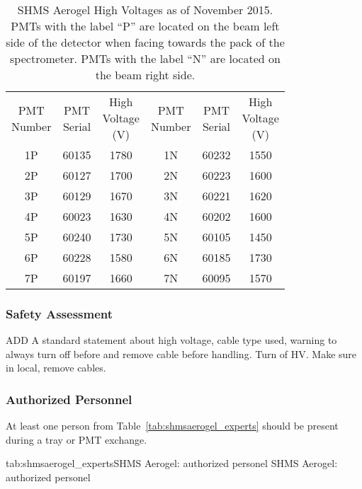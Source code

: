 {\begin{table}
\caption{SHMS Aerogel High Voltages as of November 2015.  PMTs with
  the label ``P'' are located on the beam left side of the detector
  when facing towards the pack of the spectrometer.  PMTs with the
  label ``N'' are located on the beam right side.
\label{tab:shms_aerogelhv}}
\begin{center}
\begin{tabular}{cccccc}
\specialcell{PMT\\Number}&\specialcell{PMT\\Serial}
&\specialcell{High\\Voltage\\(V)}&\specialcell{PMT\\Number}
&\specialcell{PMT\\Serial}&\specialcell{High\\Voltage\\(V)}\\
1P & 60135 & 1780 & 1N & 60232 & 1550\\
2P & 60127 & 1700 & 2N & 60223 & 1600\\
3P & 60129 & 1670 & 3N & 60221 & 1620\\
4P & 60023 & 1630 & 4N & 60202 & 1600\\
5P & 60240 & 1730 & 5N & 60105 & 1450\\
6P & 60228 & 1580 & 6N & 60185 & 1730\\
7P & 60197 & 1660 & 7N & 60095 & 1570\\
\end{tabular}
\end{center}
\end{table}


\begin{safetyen}{0}{0}

\subsubsection{Safety Assessment}

ADD A standard statement about high voltage, cable type used, warning
to always turn off before and remove cable before handling.
Turn of HV.  Make sure in local, remove cables.


\subsubsection{Authorized Personnel}
At least one person from Table~\ref{tab:shmsaerogel_experts} should be
present during a tray or PMT exchange.

\begin{namestab}{tab:shmsaerogel_experts}{SHMS Aerogel: authorized personel}{
    SHMS Aerogel: authorized personel}
  \ArthurMkrtchyan{}
  \MarcoCarmignotto{}
  \TanjaHorn{}
  \ArshakAsaturyan{}
  \VardanTadevosyan{}
  \HamletMkrtchyan{}
\end{namestab}

\end{safetyen}
}%
